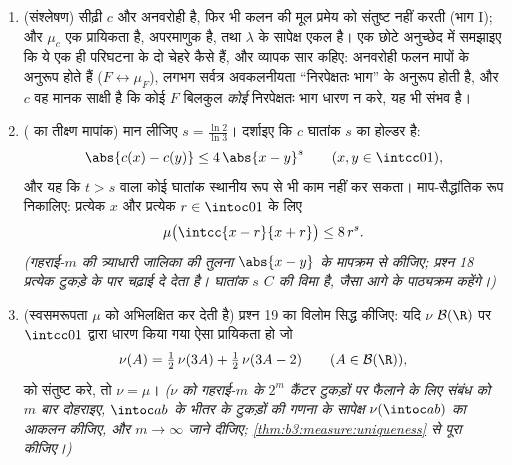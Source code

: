 \begin{problem}
\begin{enumerate}[resume]
        पूरे  वाला सबसे छोटा संवृत समुच्चय --- ठीक $C$ है।
  \item (संश्लेषण) सीढ़ी $c$  और अनवरोही है, फिर भी कलन की
        मूल प्रमेय को संतुष्ट नहीं करती (भाग I); और  $\mu_c$ एक
        प्रायिकता है, अपरमाणुक है, तथा $\lambda$ के सापेक्ष एकल है।
        एक छोटे अनुच्छेद में समझाइए कि ये एक ही परिघटना के दो
        चेहरे कैसे हैं, और व्यापक सार कहिए: अनवरोही फलन मापों के
        अनुरूप होते हैं ($F \leftrightarrow \mu_F$), लगभग सर्वत्र अवकलनीयता
        ``निरपेक्षतः  भाग'' के अनुरूप होती है, और $c$ वह
        मानक साक्षी है कि कोई  $F$ बिलकुल \emph{कोई}
        निरपेक्षतः  भाग धारण न करे, यह भी संभव है।
  \item ( का तीक्ष्ण मापांक) मान लीजिए $s =
        \frac{\ln 2}{\ln 3}$। दर्शाइए कि
        $c$ घातांक $s$ का होल्डर  है:
        \[
        \abs{c(x) - c(y)} \leq 4\,\abs{x - y}^{s}
        \qquad (x, y \in \intcc01),
        \]
        और यह कि $t > s$ वाला कोई घातांक स्थानीय रूप से भी काम नहीं
        कर सकता। माप-सैद्धांतिक रूप निकालिए: प्रत्येक $x$ और
        प्रत्येक $r \in \intoc01$ के लिए
        \[
        \mu\bigl(\intcc{x - r}{x + r}\bigr) \leq 8\,r^{s} .
        \]
        \emph{(गहराई-$m$ की त्र्याधारी जालिका की तुलना $\abs{x - y}$ के
        मापक्रम से कीजिए; प्रश्न 18 प्रत्येक टुकड़े के पार
        चढ़ाई दे देता है। घातांक $s$ $C$ की  विमा है,
        जैसा आगे के पाठ्यक्रम कहेंगे।)}
  \item (स्वसमरूपता $\mu$ को अभिलक्षित कर देती है) प्रश्न 19 का
        विलोम सिद्ध कीजिए: यदि $\nu$ $\mathcal B(\R)$ पर $\intcc01$ द्वारा धारण
        किया गया ऐसा प्रायिकता  हो जो
        \[
        \nu(A) = \tfrac12\,\nu(3A) + \tfrac12\,\nu(3A - 2)
        \qquad (A \in \mathcal B(\R)),
        \]
        को संतुष्ट करे, तो $\nu = \mu$। \emph{($\nu$ को गहराई-$m$ के
        $2^m$ कैंटर टुकड़ों पर फैलाने के लिए संबंध को $m$ बार
        दोहराइए, $\intoc ab$ के भीतर के टुकड़ों की गणना के सापेक्ष
        $\nu(\intoc ab)$ का आकलन कीजिए, और $m \to \infty$ जाने दीजिए; \cref{thm:b3:measure:uniqueness} से पूरा
        कीजिए।)}
\end{enumerate}
\end{problem}
